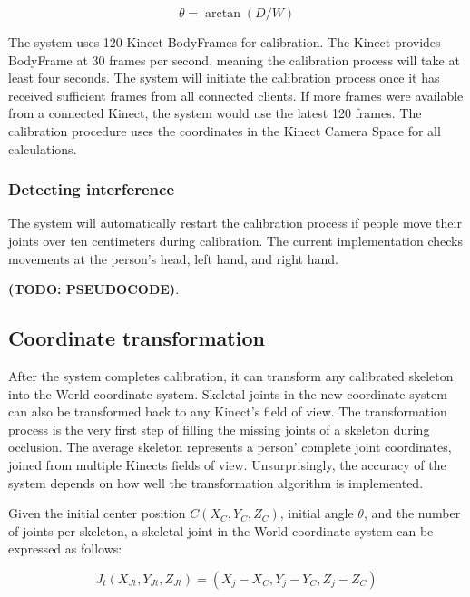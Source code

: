 \documentclass{sigchi}
\begin{document}
\begin{equation}
\label{eq:theta}
\theta = \arctan(D/W)
\end{equation}

The system uses 120 Kinect BodyFrames for calibration. The Kinect provides BodyFrame at 30 frames per second, meaning the calibration process will take at least four seconds. The system will initiate the calibration process once it has received sufficient frames from all connected clients. If more frames were available from a connected Kinect, the system would use the latest 120 frames. The calibration procedure uses the coordinates in the Kinect Camera Space for all calculations.

\subsubsection{Detecting interference}

The system will automatically restart the calibration process if people move their joints over ten centimeters during calibration. The current implementation checks movements at the person's head, left hand, and right hand.

\textbf{(TODO: PSEUDOCODE)}. 

\subsection{Coordinate transformation}

After the system completes calibration, it can transform any calibrated skeleton into the World coordinate system. Skeletal joints in the new coordinate system can also be transformed back to any Kinect's field of view. The transformation process is the very first step of filling the missing joints of a skeleton during occlusion. The average skeleton represents a person' complete joint coordinates, joined from multiple Kinects fields of view. Unsurprisingly, the accuracy of the system depends on how well the transformation algorithm is implemented.

Given the initial center position $C(X_C, Y_C, Z_C)$, initial angle $\theta$, and the number of joints per skeleton, a skeletal joint in the World coordinate system can be expressed as follows:

\begin{equation}
\label{eq:joint_translated}
J_t (X_{Jt}, Y_{Jt}, Z_{Jt}) = (X_j - X_C, Y_j - Y_C, Z_j - Z_C)
\end{equation}
\end{document}
